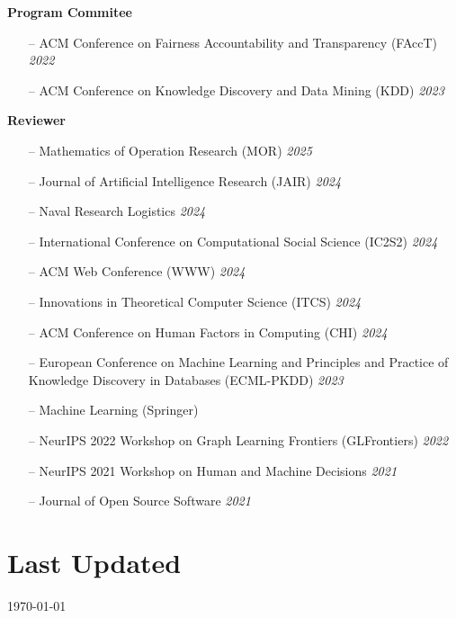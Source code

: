 \documentclass[margin]{res}
\newcommand{\field}[2]{\noindent \textbf{#1} \hfill #2 \\}
\newcommand{\referee}[3]{\textbf{#1} (\texttt{#3})\\{#2}\smallskip \\}
\begin{document}
\begin{resume}
	\field{Program Commitee}{}{
	\begin{itemize}[nosep]
		\item[--] ACM Conference on Fairness Accountability and Transparency (FAccT) \hfill \emph{2022}
		\item[--] ACM Conference on Knowledge Discovery and Data Mining (KDD) \hfill \emph{2023}
	\end{itemize}}
	\field{Reviewer}{}{ 
	\begin{itemize}[nosep]
		\item[--] Mathematics of Operation Research (MOR) \hfill \emph{2025}
		\item[--] Journal of Artificial Intelligence Research (JAIR) \hfill \emph{2024}
		\item[--] Naval Research Logistics \hfill \emph{2024}
		\item[--] International Conference on Computational Social Science (IC2S2) \hfill \emph{2024}
		\item[--] ACM Web Conference (WWW) \hfill \emph{2024}
		\item[--] Innovations in Theoretical Computer Science (ITCS) \hfill \emph{2024}
		\item[--] ACM Conference on Human Factors in Computing (CHI) \hfill \emph{2024}
		\item[--] European Conference on Machine Learning and Principles and Practice of Knowledge Discovery in Databases (ECML-PKDD) \hfill \emph{2023}
		\item[--] Machine Learning (Springer)
		\item[--] NeurIPS 2022 Workshop on Graph Learning Frontiers (GLFrontiers) \hfill \emph{2022}
		\item[--] NeurIPS 2021 Workshop on Human and Machine Decisions \hfill \emph{2021} 
		\item[--] Journal of Open Source Software \hfill \emph{2021}
	\end{itemize}}
%	

 \section{Last Updated} \today


\end{resume}
\end{document}
